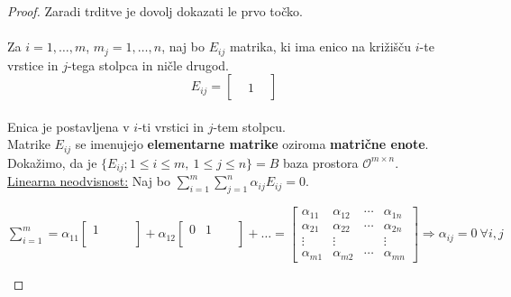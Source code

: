 \documentclass[a4paper,12pt]{article}
\begin{document}
\newpage 

\begin{proof}
	Zaradi trditve je dovolj dokazati le prvo točko. \\

	 \\

	Za $i=1,\ldots,m$, $m_j=1,\ldots,n$, naj bo $E_{ij}$ matrika, ki ima enico na križišču $i$-te vrstice in $j$-tega stolpca in ničle drugod. \\

	$$ E_{ij} = \begin{bmatrix}
		& &  \\
		& 1  \\
		& & 
	\end{bmatrix} $$ \\

	Enica je postavljena v $i$-ti vrstici in $j$-tem stolpcu.\\

	Matrike $E_{ij}$ se imenujejo \textbf{elementarne matrike} oziroma \textbf{matrične enote}. \\

	Dokažimo, da je $\{E_{ij}; 1 \leq i \leq m,~1\leq j \leq n\}= B$ baza prostora $\mathcal{O}^{m\times n}$. \\
	
	\underline{Linearna neodvisnost:} Naj bo $\sum_{i=1}^m \sum_{j=1}^n \alpha_{ij}E_{ij}=0$. \\
	
	\begin{center}

	$\sum_{i=1}^m = \alpha_{11} 
	\begin{bmatrix}
		1 & & & \\
		  & & & \\
		  & & &
	\end{bmatrix}
	+ \alpha_{12} 
	\begin{bmatrix}
		0 & 1 & & \\
		  &   & & \\
		  &   & &
	\end{bmatrix}
	+\ldots =
	\begin{bmatrix}
		\alpha_{11} & \alpha_{12} & \cdots & \alpha_{1n} \\
		\alpha_{21} & \alpha_{22} & \cdots & \alpha_{2n} \\
		\vdots & \vdots & & \vdots \\
		\alpha_{m1} & \alpha_{m2} & \cdots & \alpha_{mn}
	 \end{bmatrix}
	 \Rightarrow \alpha_{ij}=0~\forall i,j$ \\
	 

\end{center}
\end{proof}
\end{document}
